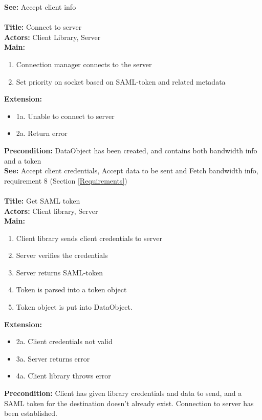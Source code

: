 		\textbf{See:} Accept client info
		\\\\
		\textbf{Title:} Connect to server \\
		\textbf{Actors:} Client Library, Server \\
		\textbf{Main:}
		\begin{enumerate}	
			\item Connection manager connects to the server
			\item Set priority on socket based on SAML-token and related metadata
		\end{enumerate}
		\textbf{Extension:}
		\begin{itemize}
			  \item[] 1a. Unable to connect to server
			  \item[] 2a. Return error
		\end{itemize}
		\textbf{Precondition:} DataObject has been created, and contains both bandwidth info and a token \\
		\textbf{See:} Accept client credentials, Accept data to be sent and Fetch bandwidth info, requirement 8 (Section \ref{Requirements})
		\\\\
		\textbf{Title:} Get SAML token \\
		\textbf{Actors:} Client library, Server \\
		\textbf{Main:}
		\begin{enumerate}
			\item Client library sends client credentials to server
			\item Server verifies the credentials
			\item Server returns SAML-token
			\item Token is parsed into a token object
			\item Token object is put into DataObject.
		\end{enumerate}
		\textbf{Extension:}
		\begin{itemize}
	        \item[] 2a. Client credentials not valid
			\item[] 3a. Server returns error
			\item[] 4a. Client library throws error
		\end{itemize}
		\textbf{Precondition:} Client has given library credentials and data to send, and a SAML token for the destination doesn't already exist. Connection to server has been established. \\
